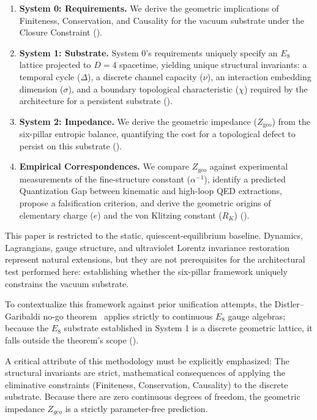 \begin{enumerate}
    \item \textbf{System 0: Requirements.} We derive the geometric implications of Finiteness, Conservation, and Causality for the vacuum substrate under the Closure Constraint
    ().
    
    \item \textbf{System 1: Substrate.} System 0's requirements uniquely specify an $E_8$ lattice projected to $D=4$ spacetime, yielding unique structural invariants: a temporal cycle ($\Delta$), a discrete channel capacity ($\nu$), an interaction embedding dimension ($\sigma$), and a boundary topological characteristic ($\chi$) required by the architecture for a persistent substrate ().

    \item \textbf{System 2: Impedance.} We derive the geometric impedance ($Z_{\text{geo}}$) from the six-pillar entropic balance, quantifying the cost for a topological defect to persist on this substrate ().

    \item \textbf{Empirical Correspondences.} We compare $Z_{\text{geo}}$ against experimental measurements of the fine-structure constant ($\alpha^{-1}$), identify a predicted Quantization Gap between kinematic and high-loop QED extractions, propose a falsification criterion, and derive the geometric origins of elementary charge ($e$) and the von Klitzing constant ($R_K$) ().
\end{enumerate}

This paper is restricted to the static, quiescent-equilibrium baseline. Dynamics, Lagrangians, gauge structure, and ultraviolet Lorentz invariance restoration represent natural extensions, but they are not prerequisites for the architectural test performed here: establishing whether the six-pillar framework uniquely constrains the vacuum substrate.

To contextualize this framework against prior unification attempts, the Distler--Garibaldi no-go theorem~\cite{distler_there_2010} applies strictly to continuous $E_8$ gauge algebras; because the $E_8$ substrate established in System 1 is a discrete geometric lattice, it falls outside the theorem's scope ().

A critical attribute of this methodology must be explicitly emphasized: The structural invariants are strict, mathematical consequences of applying the eliminative constraints (Finiteness, Conservation, Causality) to the discrete substrate. Because there are zero continuous degrees of freedom, the geometric impedance $Z_{geo}$ is a strictly parameter-free prediction.